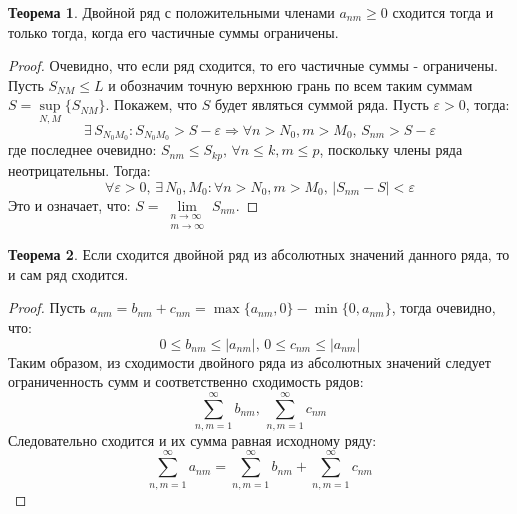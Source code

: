 \documentclass[12pt]{article}
\newcommand{\VE}{\varepsilon}
\theoremstyle{definition}
\newtheorem{theorem}{Теорема}
\newcommand{\ddsum}[2]{\displaystyle\sum\limits_{#1}^{#2}}
\begin{document}
\begin{theorem}
	Двойной ряд с положительными членами $a_{nm} \geq 0$ сходится тогда и только тогда, когда его частичные суммы ограничены.
\end{theorem}
\begin{proof}
	Очевидно, что если ряд сходится, то его частичные суммы - ограничены. Пусть $S_{NM} \leq L$ и обозначим точную верхнюю грань по всем таким суммам $S = \sup\limits_{N,M}\{S_{NM}\}$. Покажем, что $S$ будет являться суммой ряда. Пусть $\VE > 0$, тогда:
	$$
		\exists \, S_{N_0 M_0} \colon  S_{N_0 M_0} > S - \VE \Rightarrow \forall n > N_0, m > M_0, \, S_{nm} > S - \VE
	$$
	где последнее очевидно: $S_{nm} \leq S_{kp}, \, \forall n \leq k, m \leq p$, поскольку члены ряда неотрицательны. Тогда:
	$$
		\forall \VE > 0, \, \exists \, N_0, M_0 \colon \forall n > N_0, m > M_0, \, |S_{nm} - S| < \VE
	$$
	Это и означает, что: $S = \lim\limits_{\substack{n \to \infty\\ m \to \infty}}S_{nm}$.
\end{proof}

\begin{theorem}
	Если сходится двойной ряд из абсолютных значений данного ряда, то и сам ряд сходится.
\end{theorem}
\begin{proof}
	Пусть $a_{nm} = b_{nm} + c_{nm} = \max\{a_{nm},0\} - \min\{0, a_{nm}\}$, тогда очевидно, что: 
	$$
		0 \leq b_{nm} \leq |a_{nm}|, \, 0 \leq c_{nm} \leq |a_{nm}|
	$$
	Таким образом, из сходимости двойного ряда из абсолютных значений следует ограниченность сумм и соответственно сходимость рядов:
	$$
		\ddsum{n,m = 1}{\infty}b_{nm}, \, \ddsum{n,m = 1}{\infty}c_{nm}
	$$
	Следовательно сходится и их сумма равная исходному ряду:
	$$
		\ddsum{n,m = 1}{\infty}a_{nm} = \ddsum{n,m = 1}{\infty}b_{nm} + \ddsum{n,m = 1}{\infty}c_{nm}
	$$
\end{proof}
\end{document}
